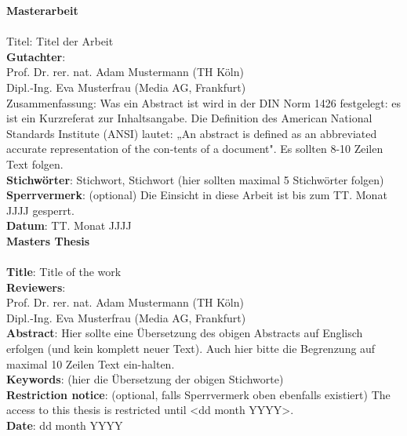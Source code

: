 \begin{titlepage}
\begin{center}
\end{center}
\newpage
\setcounter{page}{1}
\huge\textbf{Masterarbeit}\\\\
\large
Titel: Titel der Arbeit\\
\textbf{Gutachter}:\\
	Prof. Dr. rer. nat. Adam Mustermann (TH Köln)\\
	Dipl.-Ing. Eva Musterfrau (Media AG, Frankfurt)\\
Zusammenfassung: Was ein Abstract ist wird in der DIN Norm 1426 festgelegt: es ist ein Kurzreferat zur Inhaltsangabe. Die Definition des American National Standards Institute (ANSI) lautet: „An abstract is defined as an abbreviated accurate representation of the con-tents of a document". Es sollten 8-10 Zeilen Text folgen.\\
\textbf{Stichwörter}: Stichwort, Stichwort (hier sollten maximal 5 Stichwörter folgen)\\
\textbf{Sperrvermerk}: (optional) Die Einsicht in diese Arbeit ist bis zum TT. Monat JJJJ gesperrt.\\
\textbf{Datum}: TT. Monat JJJJ\\
\newpage
\huge \textbf{Masters Thesis}\\\\
\large
\textbf{Title}: Title of the work\\
\textbf{Reviewers}:\\
	Prof. Dr. rer. nat. Adam Mustermann (TH Köln)\\
	Dipl.-Ing. Eva Musterfrau (Media AG, Frankfurt)\\
\textbf{Abstract}: Hier sollte eine Übersetzung des obigen Abstracts auf Englisch erfolgen (und kein komplett neuer Text). Auch hier bitte die Begrenzung auf maximal 10 Zeilen Text ein-halten.\\
\textbf{Keywords}: (hier die Übersetzung der obigen Stichworte)\\
\textbf{Restriction notice}: (optional, falls Sperrvermerk oben ebenfalls existiert) The access to this thesis is restricted until <dd month YYYY>.\\
\textbf{Date}: dd month YYYY\\

\end{titlepage}
